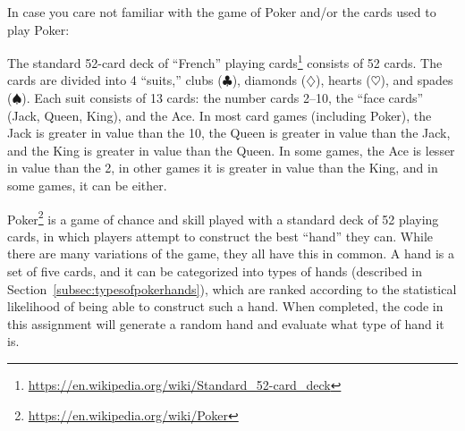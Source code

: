 In case you care not familiar with the game of Poker and/or the cards used to play Poker:

The standard 52-card deck of ``French'' playing cards\footnote{\url{https://en.wikipedia.org/wiki/Standard_52-card_deck}} consists of 52 cards.
The cards are divided into 4 ``suits,'' clubs ($\clubsuit$), diamonds ($\diamondsuit$), hearts ($\heartsuit$), and spades ($\spadesuit$).
Each suit consists of 13 cards: the number cards 2--10, the ``face cards'' (Jack, Queen, King), and the Ace.
In most card games (including Poker), the Jack is greater in value than the 10, the Queen is greater in value than the Jack, and the King is greater in value than the Queen.
In some games, the Ace is lesser in value than the 2, in other games it is greater in value than the King, and in some games, it can be either.

Poker\footnote{\url{https://en.wikipedia.org/wiki/Poker}} is a game of chance and skill played with a standard deck of 52 playing cards, in which players attempt to construct the best ``hand'' they can.
While there are many variations of the game, they all have this in common.
A hand is a set of five cards, and it can be categorized into types of hands (described in Section~\ref{subsec:typesofpokerhands}), which are ranked according to the statistical likelihood of being able to construct such a hand.
When completed, the code in this assignment will generate a random hand and evaluate what type of hand it is.
